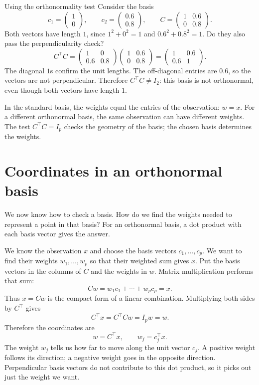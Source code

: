 \documentclass[a4paper,12pt,oneside]{report}
\begin{document}
\begin{framedexample}{Using the orthonormality test}
Consider the basis
\[
  c_1=\begin{pmatrix}1\\0\end{pmatrix},\qquad
  c_2=\begin{pmatrix}0.6\\0.8\end{pmatrix},\qquad
  C=\begin{pmatrix}1&0.6\\0&0.8\end{pmatrix}.
\]
Both vectors have length $1$, since $1^2+0^2=1$ and
$0.6^2+0.8^2=1$. Do they also pass the perpendicularity check?
\[
  C^\top C
  =\begin{pmatrix}
     1&0\\0.6&0.8
   \end{pmatrix}
   \begin{pmatrix}1&0.6\\0&0.8\end{pmatrix}
  =\begin{pmatrix}1&0.6\\0.6&1\end{pmatrix}.
\]
The diagonal $1$s confirm the unit lengths. The off-diagonal entries
are $0.6$, so the vectors are not perpendicular. Therefore
$C^\top C\ne I_2$: this basis is not orthonormal, even though both
vectors have length $1$.
\end{framedexample}

In the standard basis, the weights equal the entries of the observation:
$w=x$. For a different orthonormal basis, the same observation can have
different weights. The test $C^\top C=I_p$ checks the geometry of the
basis; the chosen basis determines the weights.

\clearpage
\section{Coordinates in an orthonormal basis}

We now know how to check a basis. How do we find the weights needed to
represent a point in that basis? For an orthonormal basis, a dot product
with each basis vector gives the answer.

We know the observation $x$ and choose the basis vectors
$c_1,\ldots,c_p$. We want to find their weights $w_1,\ldots,w_p$ so that
their weighted sum gives $x$. Put the basis vectors in the columns of
$C$ and the weights in $w$. Matrix multiplication performs that sum:
\[
  Cw=w_1c_1+\cdots+w_pc_p=x.
\]
Thus $x=Cw$ is the compact form of a linear combination. Multiplying
both sides by $C^\top$ gives
\[
  C^\top x=C^\top Cw=I_pw=w.
\]
Therefore the coordinates are
\[
  \boxed{w=C^\top x,\qquad w_j=c_j^\top x.}
\]
The weight $w_j$ tells us how far to move along the unit vector $c_j$.
A positive weight follows its direction; a negative weight goes in the
opposite direction. Perpendicular basis vectors do not contribute to
this dot product, so it picks out just the weight we want.
\end{document}
